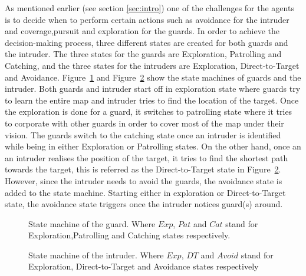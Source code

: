 As mentioned earlier (see section \ref{sec:intro}) one of the challenges for the agents is to decide when to perform certain actions such as avoidance for the intruder and coverage,pursuit and exploration for the guards. In order to achieve the decision-making process, three different states are created for both guards and the intruder. The three states for the guards are Exploration, Patrolling and Catching, and the three states for the intruders are Exploration, Direct-to-Target and Avoidance. Figure~\ref{fig:guardState} and Figure~\ref{fig:thiefState} show the state machines of guards and the intruder.
    Both guards and intruder start off in exploration state where guards try to learn the entire map and intruder tries to find the location of the target. Once the exploration is done for a guard, it switches to patrolling state where it tries to corporate with other guards in order to cover most of the map under their vision. The guards switch to the catching state once an intruder is identified while being in either Exploration or Patrolling states. On the other hand, once an an intruder realises the position of the target, it tries to find the shortest path towards the target, this is referred as the Direct-to-Target state in Figure~\ref{fig:thiefState}. However, since the intruder needs to avoid the guards, the avoidance state is added to the state machine. Starting either in exploration or Direct-to-Target state, the avoidance state triggers once the intruder notices guard(s) around.
\begin{figure}[H]
\centering

\caption{State machine of the guard. Where $Exp$, $Pat$ and $Cat$ stand for Exploration,Patrolling and Catching states respectively.}
\label{fig:guardState}
\end{figure}

\begin{figure}[H]
\centering

\caption{State machine of the intruder. Where $Exp$, $DT$ and $Avoid$ stand for Exploration, Direct-to-Target and Avoidance states respectively}
\label{fig:thiefState}
\end{figure}


